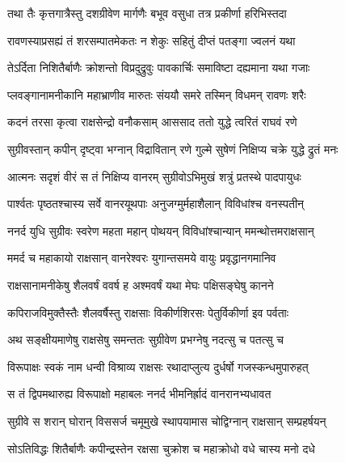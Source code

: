 
\twolineshloka
{तथा तैः कृत्तगात्रैस्तु दशग्रीवेण मार्गणैः}
{बभूव वसुधा तत्र प्रकीर्णा हरिभिस्तदा} %

\twolineshloka
{रावणस्याप्रसह्यं तं शरसम्पातमेकतः}
{न शेकुः सहितुं दीप्तं पतङ्गा ज्वलनं यथा} %

\twolineshloka
{तेऽर्दिता निशितैर्बाणैः क्रोशन्तो विप्रदुद्रुवुः}
{पावकार्चिः समाविष्टा दह्यमाना यथा गजाः} %

\twolineshloka
{प्लवङ्गानामनीकानि महाभ्राणीव मारुतः}
{संययौ समरे तस्मिन् विधमन् रावणः शरैः} %

\twolineshloka
{कदनं तरसा कृत्वा राक्षसेन्द्रो वनौकसाम्}
{आससाद ततो युद्धे त्वरितं राघवं रणे} %

\twolineshloka
{सुग्रीवस्तान् कपीन् दृष्ट्वा भग्नान् विद्रावितान् रणे}
{गुल्मे सुषेणं निक्षिप्य चक्रे युद्धे द्रुतं मनः} %

\twolineshloka
{आत्मनः सदृशं वीरं स तं निक्षिप्य वानरम्}
{सुग्रीवोऽभिमुखं शत्रुं प्रतस्थे पादपायुधः} %

\twolineshloka
{पार्श्वतः पृष्ठतश्चास्य सर्वे वानरयूथपाः}
{अनुजग्मुर्महाशैलान् विविधांश्च वनस्पतीन्} %

\twolineshloka
{ननर्द युधि सुग्रीवः स्वरेण महता महान्}
{पोथयन् विविधांश्चान्यान् ममन्थोत्तमराक्षसान्} %

\twolineshloka
{ममर्द च महाकायो राक्षसान् वानरेश्वरः}
{युगान्तसमये वायुः प्रवृद्धानगमानिव} %

\twolineshloka
{राक्षसानामनीकेषु शैलवर्षं ववर्ष ह}
{अश्मवर्षं यथा मेघः पक्षिसङ्घेषु कानने} %

\twolineshloka
{कपिराजविमुक्तैस्तैः शैलवर्षैस्तु राक्षसाः}
{विकीर्णशिरसः पेतुर्विकीर्णा इव पर्वताः} %

\twolineshloka
{अथ सङ्क्षीयमाणेषु राक्षसेषु समन्ततः}
{सुग्रीवेण प्रभग्नेषु नदत्सु च पतत्सु च} %

\twolineshloka
{विरूपाक्षः स्वकं नाम धन्वी विश्राव्य राक्षसः}
{रथादाप्लुत्य दुर्धर्षो गजस्कन्धमुपारुहत्} %

\twolineshloka
{स तं द्विपमथारुह्य विरूपाक्षो महाबलः}
{ननर्द भीमनिर्ह्रादं वानरानभ्यधावत} %

\twolineshloka
{सुग्रीवे स शरान् घोरान् विससर्ज चमूमुखे}
{स्थापयामास चोद्विग्नान् राक्षसान् सम्प्रहर्षयन्} %

\twolineshloka
{सोऽतिविद्धः शितैर्बाणैः कपीन्द्रस्तेन रक्षसा}
{चुक्रोश च महाक्रोधो वधे चास्य मनो दधे} %

